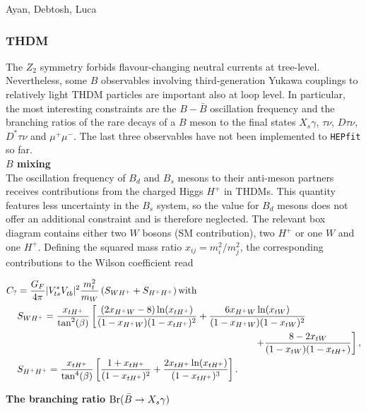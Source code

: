 \documentclass[preprint,3p,12pt]{elsarticle}
\newcommand{\HEPfit}{\texttt{HEPfit}\xspace}
\begin{document}
Ayan, Debtosh, Luca

\subsubsection{THDM}

The $Z_2$ symmetry forbids flavour-changing neutral currents at tree-level. Nevertheless, some $B$ observables involving third-generation Yukawa couplings to relatively light THDM particles are important also at loop level. In particular, the most interesting constraints are the $B-\bar{B}$ oscillation frequency and the branching ratios of the rare decays of a $B$ meson to the final states $X_s \gamma$, $\tau \nu$, $D \tau \nu$, $D^* \tau \nu$ and $\mu^+\mu^-$. The last three observables have not been implemented to \HEPfit so far.\\

\textbf{$B$ mixing}\\

The oscillation frequency of $B_d$ and $B_s$ mesons to their anti-meson partners receives contributions from the charged Higgs $H^+$ in THDMs. This quantity features less uncertainty in the $B_s$ system, so the value for $B_d$ mesons does not offer an additional constraint and is therefore neglected. The relevant box diagram contains either two $W$ bosons (SM contribution), two $H^+$ or one $W$ and one $H^+$. Defining the squared mass ratio $x_{ij}=m_i^2/m_j^2$, the corresponding contributions to the Wilson coefficient read \cite{Geng:1988bq,Deschamps:2009rh}

\begin{align}
C_?&=\frac{G_F}{4\pi} |V_{ts}^*V_{tb}^{\phantom{*}}|^2 \frac{m_t^2}{m_W} \left( S_{WH^+}+S_{H^+H^+}\right)
\text{with} \nonumber \\
&S_{WH^+}=\frac{x_{tH^+}}{\tan^2(\beta)}\left[ \frac{(2x_{H^+W}-8)\ln (x_{tH^+})}{(1-x_{H^+W})(1-x_{tH^+})^2} +\frac{6x_{H^+W}\ln (x_{tW})}{(1-x_{H^+W})(1-x_{tW})^2} \right. \nonumber \\
&\hspace*{250pt} \left. +\frac{8-2x_{tW}}{(1-x_{tW})(1-x_{tH^+})}\right] ,\nonumber \\
&S_{H^+H^+}=\frac{x_{tH^+}}{\tan^4(\beta)}\left[ \frac{1+x_{tH^+}}{(1-x_{tH^+})^2} +\frac{2x_{tH^+}\ln (x_{tH^+})}{(1-x_{tH^+})^3} \right] .\nonumber
\end{align}

\textbf{The branching ratio ${\rm Br}(\bar{B}\to X_s\gamma)$}\\
\end{document}
